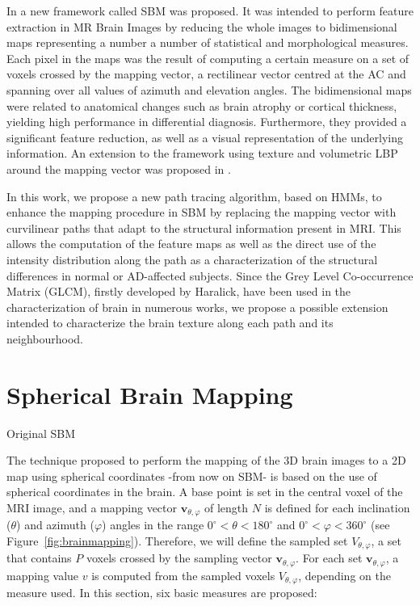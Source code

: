 In \cite{Martinez-Murcia2015} a new framework called \acf{SBM} was proposed. It was intended to perform feature extraction in MR Brain Images by reducing the whole images to bidimensional maps representing a number a number of statistical and morphological measures. Each pixel in the maps was the result of computing a certain measure on a set of voxels crossed by the mapping vector, a rectilinear vector centred at the \acf{AC} and spanning over all values of azimuth and elevation angles. The bidimensional maps were related to anatomical changes such as brain atrophy or cortical thickness, yielding high performance in differential diagnosis. Furthermore, they provided a significant feature reduction, as well as a visual representation of the underlying information. An extension to the framework using texture and volumetric \acf{LBP} ~\cite{Unay2007} around the mapping vector was proposed in \cite{Martinez-MurciaVRLBP}. 

In this work, we propose a new path tracing algorithm, based on \acfp{HMM}, to enhance the mapping procedure in \ac{SBM} by replacing the mapping vector with curvilinear paths that adapt to the structural information present in MRI. This allows the computation of the feature maps as well as the direct use of the intensity distribution along the path as a characterization of the structural differences in normal or \ac{AD}-affected subjects. Since the Grey Level Co-occurrence Matrix (GLCM), firstly developed by Haralick\cite{Haralick73}, have been used in the characterization of brain in numerous works\cite{martinez2014parametrization,sikio2015mr}, we propose a possible extension intended to characterize the brain texture along each path and its neighbourhood.

\section{Spherical Brain Mapping}
Original \ac{SBM}
\cite{Martinez-Murcia2014225,Martinez-MurciaVRLBP,Martinez-Murcia2015,Martinez-Murcia2016}

The technique proposed to perform the mapping of the 3D brain images to a 2D map using spherical coordinates -from now on \acf{SBM}-  is based on the use of spherical coordinates in the brain. A base  point is set in the central voxel of the MRI image, and a mapping vector $\mathbf{v}_{\theta,\varphi}$ of length $N$ is defined for each inclination ($\theta$) and azimuth ($\varphi$) angles in the range $0^{\circ}<\theta<180^{\circ}$ and $0^{\circ}<\varphi<360^{\circ}$ (see Figure~\ref{fig:brainmapping}). Therefore, we will define the sampled set $V_{\theta,\varphi}$, a set that contains $P$ voxels crossed by the sampling vector $\mathbf{v}_{\theta,\varphi}$.
For each set $\mathbf{v}_{\theta,\varphi}$, a mapping value $v$ is computed from the sampled voxels $V_{\theta,\varphi}$, depending on the  measure used. In this section, six basic measures are proposed:

